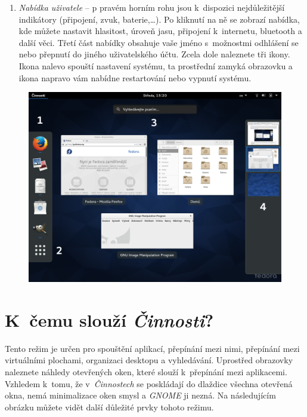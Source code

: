 \begin{enumerate}
\item\emph{Nabídka uživatele} -- p pravém horním rohu jsou k~dispozici nejdůležitější indikátory (připojení, zvuk, baterie,\dots). Po kliknutí na ně se zobrazí nabídka, kde můžete nastavit hlasitost, úroveň jasu, připojení k~internetu, bluetooth a další věci. Třetí část nabídky obsahuje vaše jméno s~možnostmi odhlášení se nebo přepnutí do jiného uživatelského účtu. Zcela dole naleznete tři ikony. Ikona nalevo spouští nastavení systému, ta prostřední zamyká obrazovku a ikona napravo vám nabídne restartování nebo vypnutí systému.
\end{enumerate}

\begin{figure}[t]
\begin{center}
\includegraphics[width=\textwidth]{img/shell-b}
 \label{fig:shell-b}
\end{center}
\end{figure}

\section*{K~čemu slouží \emph{Činnosti}?}
Tento režim je určen pro spouštění aplikací, přepínání mezi nimi, přepínání mezi virtuálními plochami, organizaci desktopu a vyhledávání. Uprostřed obrazovky naleznete náhledy otevřených oken, které slouží k~přepínání mezi aplikacemi. Vzhledem k~tomu, že v~\emph{Činnostech} se poskládají do dlaždice všechna otevřená okna, nemá minimalizace oken smysl a \emph{GNOME} ji nezná. Na následujícím obrázku můžete vidět další důležité prvky tohoto režimu.

